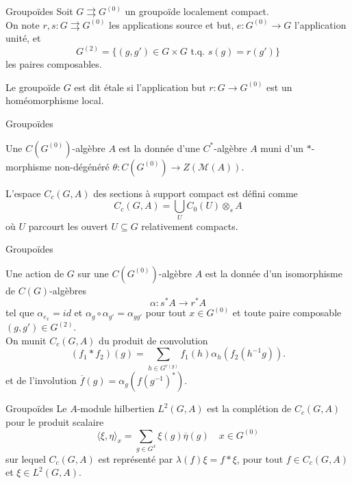 \begin{frame}{Groupoïdes}
Soit $G \rightrightarrows G^{(0)} $ un groupoïde localement compact.\\
\vspace{0.3 cm}
On note $r,s:G \rightrightarrows G^{(0)}$ les applications source et but, $e : G^{(0)} \rightarrow G$ l'application unité, et 
\[G^{(2)} = \{(g,g') \in G\times G \text{ t.q. } s(g)=r(g')\}\]
les paires composables.\\
\vspace{0.3 cm}
\begin{definitionfr}
Le groupoïde $G$ est dit étale si l'application but $r : G \rightarrow G^{(0)} $ est un homéomorphisme local.
\end{definitionfr}

\end{frame}

\begin{frame}{Groupoïdes}

Une $C(G^{(0)})$-algèbre $A$ est la donnée d'une $C^*$-algèbre $A$ muni d'un $*$-morphisme non-dégénéré $\theta : C(G^{(0)}) \rightarrow Z(\mathcal M(A))$.\\ 

\begin{definitionfr}
L'espace $C_c(G,A)$ des sections à support compact est défini comme
\[C_c(G,A) = \bigcup_U C_0(U)\otimes_s A\]
où $U$ parcourt les ouvert $U\subseteq G$ relativement compacts.
\end{definitionfr}

\end{frame}

\begin{frame}{Groupoïdes}

Une action de $G$ sur une $C(G^{(0)})$-algèbre $A$ est la donnée d'un isomorphisme de $C(G)$-algèbres 
\[\alpha : s^* A \rightarrow r^* A\]
tel que $\alpha_{e_x} = id$ et $\alpha_g \circ \alpha_{g'}  = \alpha_{gg'}$ pour tout $x\in G^{(0)}$ et toute paire composable $(g,g') \in G^{(2)}$.\\ 
\vspace{0.3 cm}
On munit $C_c(G,A)$ du produit de convolution 
\[(f_1\ast f_2)(g) = \sum_{h\in G^{r(g)}} f_1(h) \alpha_h(f_2(h^{-1}g)).\]
et de l'involution $\overline f(g)=\alpha_g(f(g^{-1})^*)$.\\

\end{frame}

\begin{frame}{Groupoïdes}
Le $A$-module hilbertien $L^2(G,A)$ est la complétion de $C_c(G,A)$ pour le produit scalaire 
\[\langle \xi ,\eta \rangle_x  = \sum_{g\in G^x} \xi(g)\overline \eta(g) \quad x\in G^{(0)} \]
sur lequel $C_c(G,A)$ est représenté par $\lambda(f) \xi = f\ast \xi$, pour tout $ f\in C_c(G,A)$ et $\xi\in L^2(G,A)$.\\
\end{frame}

